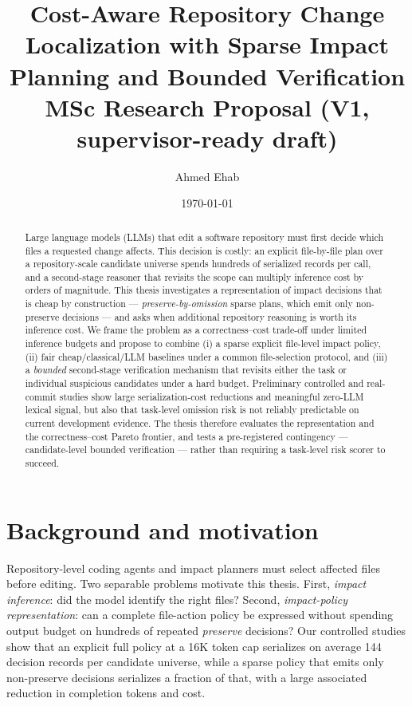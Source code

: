 \documentclass[11pt,a4paper]{article}
\title{\textbf{Cost-Aware Repository Change Localization with Sparse Impact\\[2pt]
Planning and Bounded Verification}\\[6pt]
\large MSc Research Proposal (V1, supervisor-ready draft)}
\author{Ahmed Ehab}
\date{\today}
\begin{document}
\maketitle

\begin{abstract}
Large language models (LLMs) that edit a software repository must first decide
which files a requested change affects. This decision is costly: an explicit
file-by-file plan over a repository-scale candidate universe spends hundreds of
serialized records per call, and a second-stage reasoner that revisits the
scope can multiply inference cost by orders of magnitude. This thesis
investigates a representation of impact decisions that is cheap by construction
--- \emph{preserve-by-omission} sparse plans, which emit only non-preserve
decisions --- and asks when additional repository reasoning is worth its
inference cost. We frame the problem as a correctness--cost trade-off under
limited inference budgets and propose to combine (i) a sparse explicit
file-level impact policy, (ii) fair cheap/classical/LLM baselines under a
common file-selection protocol, and (iii) a \emph{bounded} second-stage
verification mechanism that revisits either the task or individual suspicious
candidates under a hard budget. Preliminary controlled and real-commit studies
show large serialization-cost reductions and meaningful zero-LLM lexical
signal, but also that task-level omission risk is not reliably predictable on
current development evidence. The thesis therefore evaluates the representation
and the correctness--cost Pareto frontier, and tests a pre-registered
contingency --- candidate-level bounded verification --- rather than requiring
a task-level risk scorer to succeed.
\end{abstract}

\section{Background and motivation}
\label{sec:background}

Repository-level coding agents and impact planners must select affected files
before editing. Two separable problems motivate this thesis. First,
\emph{impact inference}: did the model identify the right files? Second,
\emph{impact-policy representation}: can a complete file-action policy be
expressed without spending output budget on hundreds of repeated
\emph{preserve} decisions? Our controlled studies show that an explicit full
policy at a 16K token cap serializes on average 144 decision records per
candidate universe, while a sparse policy that emits only non-preserve
decisions serializes a fraction of that, with a large associated reduction in
completion tokens and cost.
\end{document}
